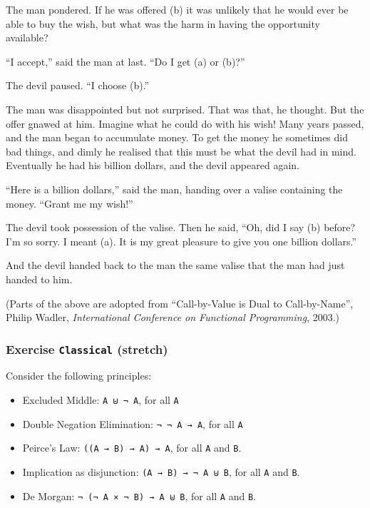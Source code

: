 The man pondered. If he was offered (b) it was unlikely that he would
ever be able to buy the wish, but what was the harm in having the
opportunity available?

``I accept,'' said the man at last. ``Do I get (a) or (b)?''

The devil paused. ``I choose (b).''

The man was disappointed but not surprised. That was that, he thought.
But the offer gnawed at him. Imagine what he could do with his wish!
Many years passed, and the man began to accumulate money. To get the
money he sometimes did bad things, and dimly he realised that this must
be what the devil had in mind. Eventually he had his billion dollars,
and the devil appeared again.

``Here is a billion dollars,'' said the man, handing over a valise
containing the money. ``Grant me my wish!''

The devil took possession of the valise. Then he said, ``Oh, did I say
(b) before? I'm so sorry. I meant (a). It is my great pleasure to give
you one billion dollars.''

And the devil handed back to the man the same valise that the man had
just handed to him.

(Parts of the above are adopted from ``Call-by-Value is Dual to
Call-by-Name'', Philip Wadler, \emph{International Conference on
Functional Programming}, 2003.)

\hypertarget{exercise-classical-stretch}{%
\subsubsection{\texorpdfstring{Exercise \texttt{Classical}
(stretch)}{Exercise Classical (stretch)}}\label{exercise-classical-stretch}}

Consider the following principles:

\begin{itemize}
\tightlist
\item
  Excluded Middle: \texttt{A\ ⊎\ ¬\ A}, for all \texttt{A}
\item
  Double Negation Elimination: \texttt{¬\ ¬\ A\ →\ A}, for all
  \texttt{A}
\item
  Peirce's Law: \texttt{((A\ →\ B)\ →\ A)\ →\ A}, for all \texttt{A} and
  \texttt{B}.
\item
  Implication as disjunction: \texttt{(A\ →\ B)\ →\ ¬\ A\ ⊎\ B}, for all
  \texttt{A} and \texttt{B}.
\item
  De Morgan: \texttt{¬\ (¬\ A\ ×\ ¬\ B)\ →\ A\ ⊎\ B}, for all \texttt{A}
  and \texttt{B}.
\end{itemize}

